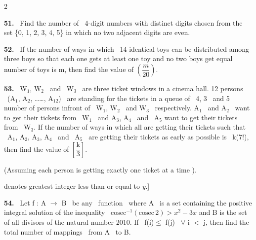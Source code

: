 \documentclass[10pt]{extarticle}
\newcommand{\qn}[1]{\par\smallskip\noindent\textbf{#1.}~}
\begin{document}
\begin{multicols}{2}
\qn{51} Find the number of \ 4-digit numbers with distinct digits chosen from the set \{0, 1, 2, 3, 4, 5\} in which no two adjacent digits are even.
\qn{52} If the number of ways in which \ 14 identical toys can be distributed among three boys so that each one gets at least one toy and no two boys get equal number of toys is m, then find the value of $\left(\dfrac m{20}\right)$.
\qn{53} W$_1$, W$_2$ \ and \ W$_3$ \ are three ticket windows in a cinema hall. 12 persons \ (A$_1$, A$_2$, \dots\dots, A$_{12}$) \ are standing for the tickets in a queue of \ 4, 3 \ and 5 number of persons infront of \ W$_1$, W$_2$ \ and W$_3$ \ respectively. A$_1$ \ and A$_2$ \ want to get their tickets from \ W$_1$ \ and A$_3$, A$_4$ \ and \ A$_5$ want to get their tickets from \ W$_3$. If the number of ways in which all are getting their tickets such that \ A$_1$, A$_2$, A$_3$, A$_4$ \ and \ A$_5$ \ are getting their tickets as early as possible is \ k(7!), then find the value of $\left[\dfrac{\mathrm k}3\right]$.\par
(Assuming each person is getting exactly one ticket at a time ).\par
[\textbf{Note:} [y] denotes greatest integer less than or equal to \textit{y}.]
\qn{54} Let f : A $\to$ B \ be any \ function \ where A \ is a set containing the positive integral solution of the inequality \ $\mathrm{cosec}^{-1}(\mathrm{cosec}\,2)>x^2-3x$ and B is the set of all divisors of the natural number 2010. If \ f(i)$\le$ f(j) \ $\forall$ i $<$ j, then find the total number of mappings \ from A \ to B.
\end{multicols}
\end{document}
